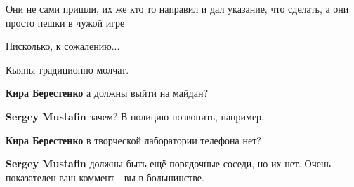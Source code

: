 \begin{itemize}
Они не сами пришли, их же кто то направил и дал указание, что сделать, а они просто пешки в чужой игре

 
Нисколько, к сожалению...

 
Кыяны традиционно молчат.

\begin{itemize}
 
\textbf{Кира Берестенко} а должны выйти на майдан?

 
\textbf{Sergey Mustafin} зачем? В полицию позвонить, например.

 
\textbf{Кира Берестенко} в творческой лаборатории телефона нет?

 
\textbf{Sergey Mustafin} должны быть ещё порядочные соседи, но их нет. Очень показателен ваш коммент - вы в большинстве.


\end{itemize}
\end{itemize}
